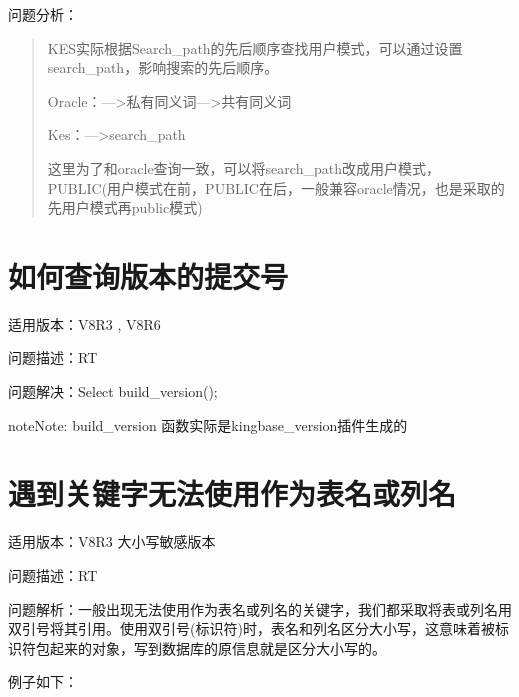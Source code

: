 \documentclass[a4,10pt,oneside,english]{sphinxmanual}
\begin{document}
问题分析：
\begin{quote}

KES实际根据Search\_path的先后顺序查找用户模式，可以通过设置search\_path，影响搜索的先后顺序。

Oracle：—>私有同义词—>共有同义词

Kes：—>search\_path

这里为了和oracle查询一致，可以将search\_path改成用户模式，PUBLIC(用户模式在前，PUBLIC在后，一般兼容oracle情况，也是采取的先用户模式再public模式)
\end{quote}


\section{如何查询版本的提交号}
\label{\detokenize{sql:id11}}
适用版本：V8R3 , V8R6

问题描述：RT

问题解决：Select build\_version();

\begin{sphinxadmonition}{note}{Note:}
build\_version 函数实际是kingbase\_version插件生成的
\end{sphinxadmonition}


\section{遇到关键字无法使用作为表名或列名}
\label{\detokenize{sql:id12}}
适用版本：V8R3 大小写敏感版本

问题描述：RT

问题解析：一般出现无法使用作为表名或列名的关键字，我们都采取将表或列名用双引号将其引用。使用双引号(标识符)时，表名和列名区分大小写，这意味着被标识符包起来的对象，写到数据库的原信息就是区分大小写的。

例子如下：
\end{document}
